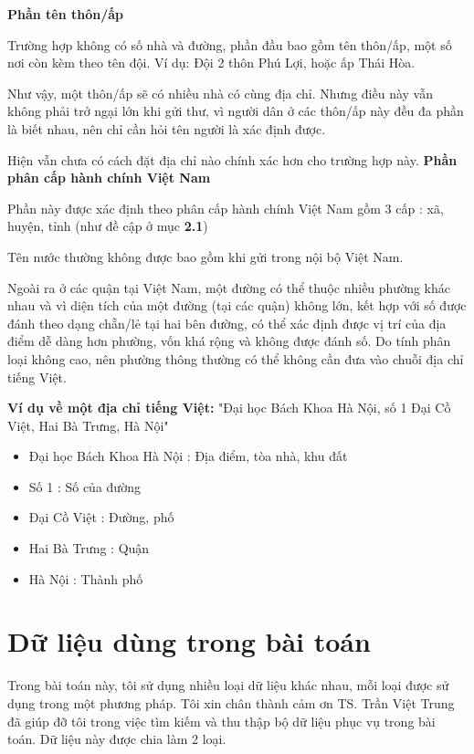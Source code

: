 \textbf{Phần tên thôn/ấp}

Trường hợp không có số nhà và đường, phần đầu bao gồm tên thôn/ấp, một số nơi còn kèm theo tên đội. Ví dụ: Đội 2 thôn Phú Lợi, hoặc ấp Thái Hòa.

Như vậy, một thôn/ấp sẽ có nhiều nhà có cùng địa chỉ. Nhưng điều này vẫn không phải trở ngại lớn khi gửi thư, vì người dân ở các thôn/ấp này đều đa phần là biết nhau, nên chỉ cần hỏi tên người là xác định được.

Hiện vẫn chưa có cách đặt địa chỉ nào chính xác hơn cho trường hợp này.
\textbf{Phần phân cấp hành chính Việt Nam}

Phần này được xác định theo phân cấp hành chính Việt Nam gồm 3 cấp : xã, huyện, tỉnh (như đề cập ở mục \textbf{2.1})

Tên nước thường không được bao gồm khi gửi trong nội bộ Việt Nam.

Ngoài ra ở các quận tại Việt Nam, một đường có thể thuộc nhiều phường khác nhau và vì diện tích của một đường (tại các quận) không lớn, kết hợp với số  được đánh theo dạng chẵn/lẻ tại hai bên đường, có thể xác định được vị trí của địa điểm dễ dàng hơn phường, vốn khá rộng và không được đánh số. Do tính phân loại không cao, nên phường thông thường có thể không cần đưa vào chuỗi địa chỉ tiếng Việt.

\vspace*{0.5cm}
\textbf{Ví dụ về một địa chỉ tiếng Việt:} "Đại học Bách Khoa Hà Nội, số 1 Đại Cồ Việt, Hai Bà Trưng, Hà Nội"

\begin{itemize}
    \item Đại học Bách Khoa Hà Nội : Địa điểm, tòa nhà, khu đất
    \item Số 1 : Số của đường
    \item Đại Cồ Việt : Đường, phố
    \item Hai Bà Trưng : Quận
    \item Hà Nội : Thành phố
\end{itemize}

\section{Dữ liệu dùng trong bài toán}

Trong bài toán này, tôi sử dụng nhiều loại dữ liệu khác nhau, mỗi loại được sử dụng trong một phương pháp. Tôi xin chân thành cảm ơn TS. Trần Việt Trung đã giúp đỡ tôi trong việc tìm kiếm và thu thập bộ dữ liệu phục vụ trong bài toán. Dữ liệu này được chia làm 2 loại.

